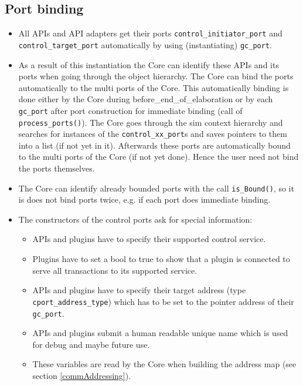 \subsection{Port binding}
\label{commPortBinding}
\begin{itemize}
	\item All APIs and API adapters get their ports \lstinline|control_initiator_port| and \lstinline|control_target_port| automatically by using (instantiating) \lstinline|gc_port|. 

	\item As a result of this instantiation the Core can identify these APIs and its ports when going through the object hierarchy. The Core can bind the ports automatically to the multi ports of the Core. This automatically binding is done either by the Core during before\_end\_of\_elaboration or by each \lstinline|gc_port| after port construction for immediate binding (call of \lstinline|process_ports()|). \newline The Core goes through the sim context hierarchy and searches for instances of the \lstinline|control_xx_port|s and saves pointers to them into a list (if not yet in it). Afterwards these ports are automatically bound to the multi ports of the Core (if not yet done). Hence the user need not bind the ports themselves. 
	
	\item The Core can identify already bounded ports with the
	call \lstinline|is_Bound()|, so it is does not bind ports
	twice, e.g. if each port does immediate binding.
	
	\item The constructors of the control ports ask for special information: 
	\begin{itemize}
		\item APIs and plugins have to specify their supported control service. 
		\item Plugins have to set a bool to true to show that a plugin is connected to serve all transactions to its supported service. 
		\item APIs and plugins have to specify their target address (type \lstinline|cport_address_type|) which has to be set to the pointer address of their \lstinline|gc_port|. 
		\item APIs and plugins submit a human readable unique name which is used for debug and maybe future use. 
		\item These variables are read by the Core when building the address map (see section \ref{commAddressing}). 
	\end{itemize}

\end{itemize}


